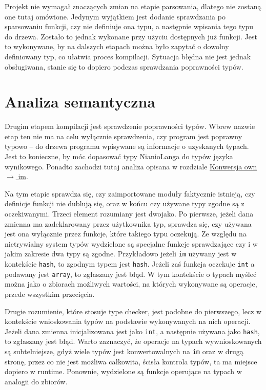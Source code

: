 \documentclass[licencjacka]{pracamgr}
\begin{document}
Projekt nie wymagał znaczących zmian na etapie parsowania, dlatego nie zostaną one tutaj omówione. Jedynym wyjątkiem jest dodanie sprawdzania po
sparsowaniu funkcji, czy nie definiuje ona typu, a następnie wpisania tego typu do drzewa. Zostało to jednak wykonane przy użyciu dostępnych już
funkcji. Jest to wykonywane, by na dalszych etapach można było zapytać o dowolny definiowany typ, co ułatwia proces kompilacji. Sytuacja błędna nie
jest jednak obsługiwana, stanie się to dopiero podczas sprawdzania poprawności typów.
\section{Analiza semantyczna}
Drugim etapem kompilacji jest sprawdzenie poprawności typów. Wbrew nazwie etap ten nie ma na celu wyłącznie sprawdzenia, czy program jest poprawny
typowo -- do drzewa programu wpisywane są informacje o uzyskanych typach. Jest to konieczne, by móc dopasować typy NianioLanga do typów języka
wynikowego. Ponadto zachodzi tutaj analiza opisana w rozdziale \hyperref[sec:own_to_im]{Konwersja own $\rightarrow$ im}.

Na tym etapie sprawdza się, czy zaimportowane moduły faktycznie istnieją, czy definicje funkcji nie dublują się, oraz w końcu czy używane typy zgodne
są z oczekiwanymi. Trzeci element rozumiany jest dwojako. Po pierwsze, jeżeli dana zmienna ma zadeklarowany przez użytkownika typ, sprawdza się, czy
używana jest ona wyłącznie przez funkcje, które takiego typu oczekują.  Ze względu na nietrywialny system typów wydzielone są specjalne funkcje
sprawdzające czy i w jakim zakresie dwa typy są zgodne. Przykładowo jeżeli \texttt{im} używany jest w kontekście \texttt{hash}, to zgodnym typem jest
\texttt{hash}. Jeżeli zaś funkcja oczekuje \texttt{int} a podawany jest \texttt{array}, to zgłaszany jest błąd. W tym kontekście o typach myśleć można
jako o zbiorach możliwych wartości, na których wykonywane są operacje, przede wszystkim przecięcia.

Drugie rozumienie, które stosuje type checker, jest podobne do pierwszego, lecz w kontekście wnioskowania typów na podstawie wykonywanych na nich
operacji. Jeżeli dana zmienna inicjalizowana jest jako \texttt{int}, a następnie używana jako \texttt{hash}, to zgłaszany jest błąd. Warto zaznaczyć,
że operacje na typach wywnioskowanych są subtelniejsze, gdyż wiele typów jest konwertowalnych na \texttt{im} oraz w drugą stronę, przez co nie jest
możliwa całkowita, ścisła kontrola typów, ta ma miejsce dopiero w runtime. Ponownie, wydzielone są funkcje operujące na typach w analogii do zbiorów.
\end{document}

